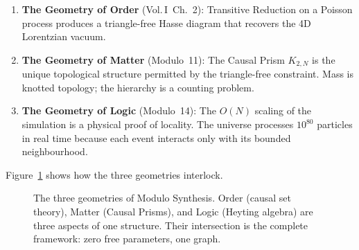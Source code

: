 \documentclass[11pt, a4paper, openany]{book}
\newcommand{\VolI}[1]{\textnormal{(Vol.\,I~#1)}}
\begin{document}
\begin{tcolorbox}[colback=fourthlight,colframe=fourth,title={The Three Geometries of Modulo Synthesis}]
\begin{enumerate}[leftmargin=*]
  \item \textbf{The Geometry of Order} \VolI{Ch.~2}: Transitive Reduction on a Poisson process produces a triangle-free Hasse diagram that recovers the 4D Lorentzian vacuum.

  \item \textbf{The Geometry of Matter} (Modulo~11): The Causal Prism $K_{2,N}$ is the unique topological structure permitted by the triangle-free constraint. Mass is knotted topology; the hierarchy is a counting problem.

  \item \textbf{The Geometry of Logic} (Modulo~14): The $O(N)$ scaling of the simulation is a physical proof of locality. The universe processes $10^{80}$ particles in real time because each event interacts only with its bounded neighbourhood.
\end{enumerate}
\end{tcolorbox}

\noindent
Figure~\ref{fig:three-geometries} shows how the three geometries
interlock.

\begin{figure}[ht]
\centering
{}
\caption{The three geometries of Modulo Synthesis.  Order (causal
set theory), Matter (Causal Prisms), and Logic (Heyting algebra)
are three aspects of one structure.  Their intersection is the
complete framework: zero free parameters, one graph.}
\label{fig:three-geometries}
\end{figure}
\end{document}
